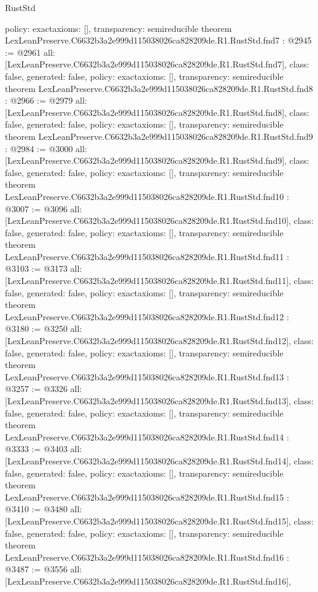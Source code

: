 \begin{lexlean}{RustStd}
\begin{coremodule}
{  policy: exact{axioms: []},
  transparency: semireducible
}
theorem LexLeanPreserve.C6632b3a2e999d115038026ca828209de.R1.RustStd.fnd7 : @2945 := @2961 {
  all: [LexLeanPreserve.C6632b3a2e999d115038026ca828209de.R1.RustStd.fnd7],
  class: false,
  generated: false,
  policy: exact{axioms: []},
  transparency: semireducible
}
theorem LexLeanPreserve.C6632b3a2e999d115038026ca828209de.R1.RustStd.fnd8 : @2966 := @2979 {
  all: [LexLeanPreserve.C6632b3a2e999d115038026ca828209de.R1.RustStd.fnd8],
  class: false,
  generated: false,
  policy: exact{axioms: []},
  transparency: semireducible
}
theorem LexLeanPreserve.C6632b3a2e999d115038026ca828209de.R1.RustStd.fnd9 : @2984 := @3000 {
  all: [LexLeanPreserve.C6632b3a2e999d115038026ca828209de.R1.RustStd.fnd9],
  class: false,
  generated: false,
  policy: exact{axioms: []},
  transparency: semireducible
}
theorem LexLeanPreserve.C6632b3a2e999d115038026ca828209de.R1.RustStd.fnd10 : @3007 := @3096 {
  all: [LexLeanPreserve.C6632b3a2e999d115038026ca828209de.R1.RustStd.fnd10],
  class: false,
  generated: false,
  policy: exact{axioms: []},
  transparency: semireducible
}
theorem LexLeanPreserve.C6632b3a2e999d115038026ca828209de.R1.RustStd.fnd11 : @3103 := @3173 {
  all: [LexLeanPreserve.C6632b3a2e999d115038026ca828209de.R1.RustStd.fnd11],
  class: false,
  generated: false,
  policy: exact{axioms: []},
  transparency: semireducible
}
theorem LexLeanPreserve.C6632b3a2e999d115038026ca828209de.R1.RustStd.fnd12 : @3180 := @3250 {
  all: [LexLeanPreserve.C6632b3a2e999d115038026ca828209de.R1.RustStd.fnd12],
  class: false,
  generated: false,
  policy: exact{axioms: []},
  transparency: semireducible
}
theorem LexLeanPreserve.C6632b3a2e999d115038026ca828209de.R1.RustStd.fnd13 : @3257 := @3326 {
  all: [LexLeanPreserve.C6632b3a2e999d115038026ca828209de.R1.RustStd.fnd13],
  class: false,
  generated: false,
  policy: exact{axioms: []},
  transparency: semireducible
}
theorem LexLeanPreserve.C6632b3a2e999d115038026ca828209de.R1.RustStd.fnd14 : @3333 := @3403 {
  all: [LexLeanPreserve.C6632b3a2e999d115038026ca828209de.R1.RustStd.fnd14],
  class: false,
  generated: false,
  policy: exact{axioms: []},
  transparency: semireducible
}
theorem LexLeanPreserve.C6632b3a2e999d115038026ca828209de.R1.RustStd.fnd15 : @3410 := @3480 {
  all: [LexLeanPreserve.C6632b3a2e999d115038026ca828209de.R1.RustStd.fnd15],
  class: false,
  generated: false,
  policy: exact{axioms: []},
  transparency: semireducible
}
theorem LexLeanPreserve.C6632b3a2e999d115038026ca828209de.R1.RustStd.fnd16 : @3487 := @3556 {
  all: [LexLeanPreserve.C6632b3a2e999d115038026ca828209de.R1.RustStd.fnd16],
}
\end{coremodule}
\end{lexlean}
